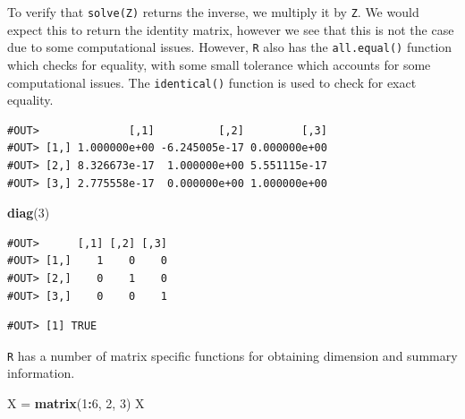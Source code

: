 \documentclass[]{book}
\newenvironment{Shaded}{\begin{snugshade}}{\end{snugshade}}
\newcommand{\KeywordTok}[1]{\textcolor[rgb]{0.13,0.29,0.53}{\textbf{#1}}}
\newcommand{\DecValTok}[1]{\textcolor[rgb]{0.00,0.00,0.81}{#1}}
\newcommand{\StringTok}[1]{\textcolor[rgb]{0.31,0.60,0.02}{#1}}
\newcommand{\OperatorTok}[1]{\textcolor[rgb]{0.81,0.36,0.00}{\textbf{#1}}}
\newcommand{\NormalTok}[1]{#1}
\theoremstyle{definition}
\theoremstyle{definition}
\theoremstyle{definition}
\theoremstyle{remark}
\begin{document}
To verify that \texttt{solve(Z)} returns the inverse, we multiply it by
\texttt{Z}. We would expect this to return the identity matrix, however
we see that this is not the case due to some computational issues.
However, \texttt{R} also has the \texttt{all.equal()} function which
checks for equality, with some small tolerance which accounts for some
computational issues. The \texttt{identical()} function is used to check
for exact equality.

\begin{Shaded}
\end{Shaded}

\begin{verbatim}
#OUT>              [,1]          [,2]         [,3]
#OUT> [1,] 1.000000e+00 -6.245005e-17 0.000000e+00
#OUT> [2,] 8.326673e-17  1.000000e+00 5.551115e-17
#OUT> [3,] 2.775558e-17  0.000000e+00 1.000000e+00
\end{verbatim}

\begin{Shaded}
\begin{Highlighting}[]
\KeywordTok{diag}\NormalTok{(}\DecValTok{3}\NormalTok{)}
\end{Highlighting}
\end{Shaded}

\begin{verbatim}
#OUT>      [,1] [,2] [,3]
#OUT> [1,]    1    0    0
#OUT> [2,]    0    1    0
#OUT> [3,]    0    0    1
\end{verbatim}

\begin{Shaded}
\end{Shaded}

\begin{verbatim}
#OUT> [1] TRUE
\end{verbatim}

\texttt{R} has a number of matrix specific functions for obtaining
dimension and summary information.

\begin{Shaded}
\begin{Highlighting}[]
\NormalTok{X =}\StringTok{ }\KeywordTok{matrix}\NormalTok{(}\DecValTok{1}\OperatorTok{:}\DecValTok{6}\NormalTok{, }\DecValTok{2}\NormalTok{, }\DecValTok{3}\NormalTok{)}
\NormalTok{X}
\end{Highlighting}
\end{Shaded}
\end{document}
